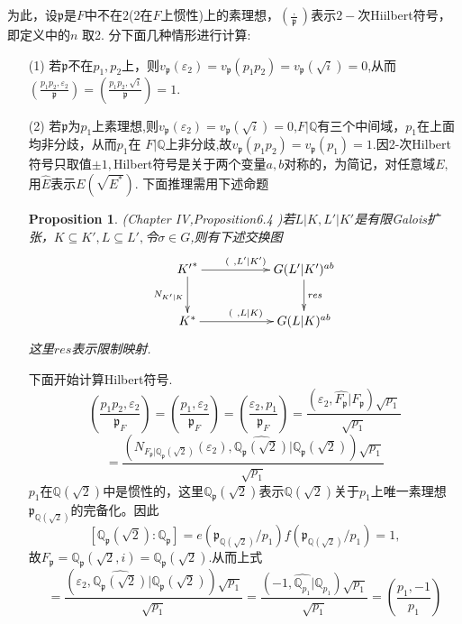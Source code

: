 \documentclass[UTF8]{article}
\newtheorem{prop}{Proposition}[section]
\begin{document}
 为此，设$\mathfrak{p}$是$F$中不在$2$(2在$F$上惯性)上的素理想，$\left(\frac{\ , \ }{\mathfrak{p}}\right)$表示$2-$次Hiilbert符号，即定义中的$n$
 取2.
 分下面几种情形进行计算:
 \begin{itemize}
 	\item[(1)] 若$\mathfrak{p}$不在$p_{1},p_{2}$上，则$v_{\mathfrak{p}}(\varepsilon_{2})=v_{\mathfrak{p}}(p_{1}p_{2})=v_{\mathfrak{p}}(\sqrt{i})=0$,从而$
 	\left(\frac{p_{1}p_{2},\varepsilon_{2}}{\mathfrak{p}}\right)=\left(\frac{p_{1}p_{2},\sqrt{i}}{\mathfrak{p}}\right)=1.$
 	\item[(2)] 若$\mathfrak{p}$为$p_{1}$上素理想,则$v_{\mathfrak{p}}(\varepsilon_{2})=v_{\mathfrak{p}}(\sqrt{i})=0$,$F|\mathbb{Q}$有三个中间域，$p_{1}$在上面均非分歧，从而$p_{1}$在
 	$F|\mathbb{Q}$上非分歧,故$v_{\mathfrak{p}}(p_{1}p_{2})=v_{\mathfrak{p}}(p_{1})=1.$因2-次Hilbert符号只取值$\pm 1,$Hilbert符号是关于两个变量$a,b$对称的，为简记，对任意域$E,$用$\widehat{E}$表示$E(\sqrt{E^{*}})$.
 	下面推理需用下述命题
 	\begin{prop}
 			(\cite{Ne}Chapter IV,Proposition6.4 )若$L|K,L'|K'$是有限Galois扩张，$K\subseteq K',L\subseteq L',$令$\sigma\in G$,则有下述交换图
 		$$
 		\xymatrix{
 			{K'}^{*}\ar[rr]^{(\ ,L'|K')}\ar[d]_{N_{K'|K}}& &G(L'|K')^{ab}\ar[d]^{res}\\
 			K^{*}\ar[rr]^{(\ ,L|K)}&&G(L|K)^{ab}	
 		}
 		$$
 		这里$res$表示限制映射.
 	\end{prop}
 下面开始计算Hilbert符号.
 	$$
 	\left(\frac{p_{1}p_{2},\varepsilon_{2}}{\mathfrak{p}_{F}}\right)=	\left(\frac{p_{1},\varepsilon_{2}}{\mathfrak{p}_{F}}\right)=\left(\frac{\varepsilon_{2},p_{1}}{\mathfrak{p}_{F}}\right)=\frac{(\varepsilon_{2},\widehat{F_{\mathfrak{p}}}|F_{\mathfrak{p}})\sqrt{p_{1}}}{\sqrt{p_{1}}}
 	$$
 	$$=
 	\frac{(N_{F_{\mathfrak{p}}|\mathbb{Q}_{\mathfrak{p}}(\sqrt{2})}(\varepsilon_{2}),\widehat{\mathbb{Q}_{\mathfrak{p}}(\sqrt{2})}|\mathbb{Q}_{\mathfrak{p}}(\sqrt{2}))\sqrt{p_{1}}}{\sqrt{p_{1}}}
 	$$
 	$p_{1}$在$\mathbb{Q}(\sqrt{2})$中是惯性的，这里$\mathbb{Q}_{\mathfrak{p}}(\sqrt{2})$表示$\mathbb{Q}(\sqrt{2})$关于$p_{1}$上唯一素理想$\mathfrak{p}_{\mathbb{Q}(\sqrt{2})}$的完备化。因此$$[\mathbb{Q}_{\mathfrak{p}}(\sqrt{2}):\mathbb{Q}_{\mathfrak{p}}]=e(\mathfrak{p}_{\mathbb{Q}(\sqrt{2})}/p_{1})f(\mathfrak{p}_{\mathbb{Q}(\sqrt{2})}/p_{1})=1,$$
 	故$F_{\mathfrak{p}}=\mathbb{Q}_{\mathfrak{p}}(\sqrt{2},i)=\mathbb{Q}_{\mathfrak{p}}(\sqrt{2}).
 	$从而上式
 	$$
 	=\frac{(\varepsilon_{2},\widehat{\mathbb{Q}_{\mathfrak{p}}(\sqrt{2})}|\mathbb{Q}_{\mathfrak{p}}(\sqrt{2}))\sqrt{p_{1}}}{\sqrt{p_{1}}}=\frac{(-1,\widehat{\mathbb{Q}_{p_{1}}}|\mathbb{Q}_{p_{1}})\sqrt{p_{1}}}{\sqrt{p_{1}}}=\left(\frac{p_{1},-1}{p_{1}}\right)
$$
\end{itemize}
\end{document}
